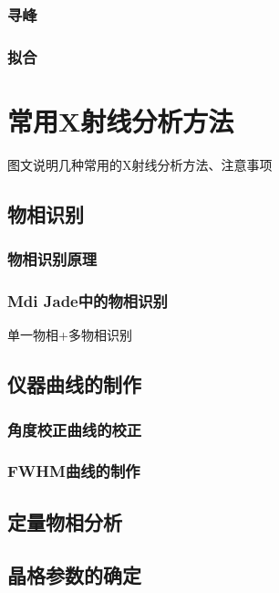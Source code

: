 \documentclass[12pt,a4paper,twoside]{ctexart}
\newcommand{\smtext}[1]{{\fontsize{9.3pt}{12pt}\selectfont #1}}
\begin{document}
\subsubsection{寻峰}

\subsubsection{拟合}

\section{常用X射线分析方法}

\smtext{图文说明几种常用的X射线分析方法、注意事项}

\subsection{物相识别}

\subsubsection{物相识别原理}

\subsubsection{Mdi Jade中的物相识别}

\smtext{单一物相+多物相识别}

\subsection{仪器曲线的制作}

\subsubsection{角度校正曲线的校正}

\subsubsection{FWHM曲线的制作}

\subsection{定量物相分析}

\subsection{晶格参数的确定}
\end{document}
